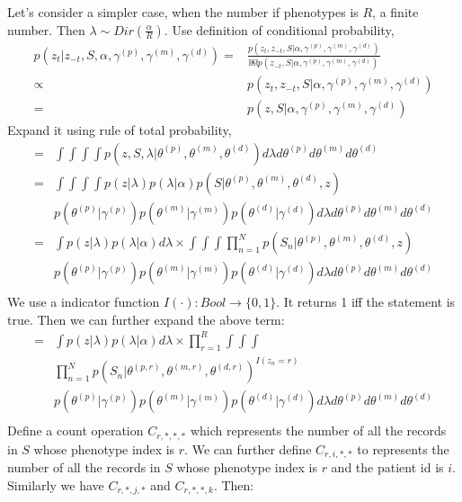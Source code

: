 \documentclass[conference]{IEEEtran}
\begin{document}
Let's consider a simpler case, when the number if phenotypes is $R$, a finite number. Then $\lambda \sim Dir(\frac{\alpha}{R})$. 
Use definition of conditional probability, 
\begin{align*}
	p(z_t | z_{-t}, S, \alpha, \gamma^{(p)}, \gamma^{(m)}, \gamma^{(d)}) = & 
	\frac{p(z_t, z_{-t}, S | \alpha, \gamma^{(p)}, \gamma^{(m)}, \gamma^{(d)})}{￼p(z_{-t}, S | \alpha, \gamma^{(p)}, \gamma^{(m)}, \gamma^{(d)})} \\
	\propto & p(z_t , z_{-t}, S | \alpha, \gamma^{(p)}, \gamma^{(m)}, \gamma^{(d)}) \\
	= & p(z, S | \alpha, \gamma^{(p)}, \gamma^{(m)}, \gamma^{(d)})
\end{align*}
Expand it using rule of total probability, 
\begin{align*}
 = & \int \int \int \int p(z, S, \lambda | \theta^{(p)}, \theta^{(m)}, \theta^{(d)}) d\lambda d\theta^{(p)} d\theta^{(m)} d\theta^{(d)} \\
 = & \int \int \int \int p(z | \lambda) p(\lambda | \alpha) p(S | \theta^{(p)}, \theta^{(m)}, \theta^{(d)}, z) \\
  & p(\theta^{(p)} | \gamma^{(p)}) p(\theta^{(m)} | \gamma^{(m)}) p(\theta^{(d)} | \gamma^{(d)}) d\lambda d\theta^{(p)} d\theta^{(m)} d\theta^{(d)} \\
 = & \int p(z | \lambda) p(\lambda | \alpha) d\lambda \times 
  \int \int \int \prod_{n=1}^N p(S_n | \theta^{(p)}, \theta^{(m)}, \theta^{(d)}, z) \\
 & p(\theta^{(p)} | \gamma^{(p)}) p(\theta^{(m)} | \gamma^{(m)}) p(\theta^{(d)} | \gamma^{(d)}) d\lambda d\theta^{(p)} d\theta^{(m)} d\theta^{(d)} \\
\end{align*}
We use a indicator function $I(\cdot): Bool \rightarrow \{0, 1\}$. It returns 1 iff the statement is true. Then we can further expand the above term:
\begin{align*}
= & \int p(z | \lambda) p(\lambda | \alpha) d\lambda \times \prod_{r=1}^R \int \int \int \\
 & \prod_{n=1}^N p(S_n | \theta^{(p, r)}, \theta^{(m, r)}, \theta^{(d, r)})^{I(z_n = r)} \\
 & p(\theta^{(p)} | \gamma^{(p)}) p(\theta^{(m)} | \gamma^{(m)}) p(\theta^{(d)} | \gamma^{(d)}) d\lambda d\theta^{(p)} d\theta^{(m)} d\theta^{(d)} \\
\end{align*} 
Define a count operation $C_{r, *, *, *}$ which represents the number of all the records in $S$ whose phenotype index is $r$. We can further define $C_{r, i, *, *}$ to represents the number of all the records in $S$ whose phenotype index is $r$ and the patient id is $i$. Similarly we have $C_{r, *, j, *}$ and $C_{r, *, *, k}$. Then:
\end{document}
